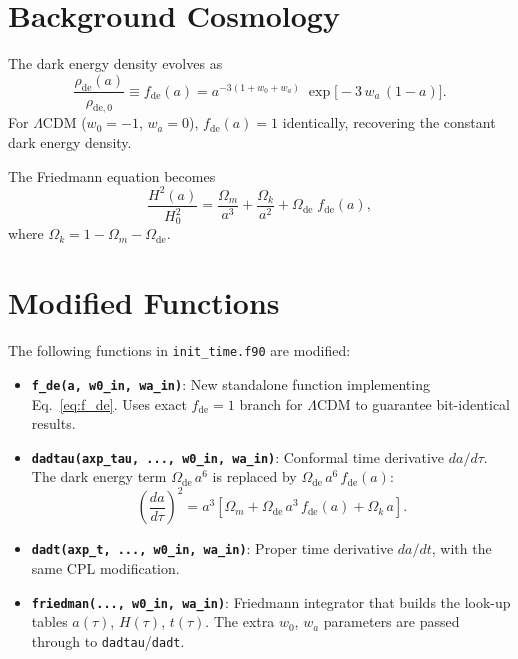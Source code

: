\documentclass[11pt,fleqn]{book}
\begin{document}
\section{Background Cosmology}

The dark energy density evolves as
\begin{equation}\label{eq:f_de}
  \frac{\rho_{\mathrm{de}}(a)}{\rho_{\mathrm{de},0}}
  \equiv f_{\mathrm{de}}(a)
  = a^{-3(1+w_0+w_a)}\;\exp\!\bigl[-3\,w_a\,(1-a)\bigr].
\end{equation}
For $\Lambda$CDM ($w_0=-1$, $w_a=0$), $f_{\mathrm{de}}(a) = 1$ identically, recovering the constant dark energy density.

The Friedmann equation becomes
\begin{equation}\label{eq:friedmann_cpl}
  \frac{H^2(a)}{H_0^2}
  = \frac{\Omega_m}{a^3} + \frac{\Omega_k}{a^2}
    + \Omega_{\mathrm{de}}\;f_{\mathrm{de}}(a),
\end{equation}
where $\Omega_k = 1 - \Omega_m - \Omega_{\mathrm{de}}$.

\section{Modified Functions}

The following functions in \texttt{init\_time.f90} are modified:

\begin{itemize}[nosep]
  \item \textbf{\texttt{f\_de(a, w0\_in, wa\_in)}}: New standalone function implementing Eq.~\eqref{eq:f_de}.  Uses exact $f_{\mathrm{de}}=1$ branch for $\Lambda$CDM to guarantee bit-identical results.

  \item \textbf{\texttt{dadtau(axp\_tau, ..., w0\_in, wa\_in)}}: Conformal time derivative $da/d\tau$.  The dark energy term $\Omega_{\mathrm{de}}\,a^6$ is replaced by $\Omega_{\mathrm{de}}\,a^6\,f_{\mathrm{de}}(a)$:
  \begin{equation}
    \left(\frac{da}{d\tau}\right)^2 = a^3\!\left[\Omega_m + \Omega_{\mathrm{de}}\,a^3\,f_{\mathrm{de}}(a) + \Omega_k\,a\right].
  \end{equation}

  \item \textbf{\texttt{dadt(axp\_t, ..., w0\_in, wa\_in)}}: Proper time derivative $da/dt$, with the same CPL modification.

  \item \textbf{\texttt{friedman(..., w0\_in, wa\_in)}}: Friedmann integrator that builds the look-up tables $a(\tau)$, $H(\tau)$, $t(\tau)$.  The extra $w_0$, $w_a$ parameters are passed through to \texttt{dadtau}/\texttt{dadt}.
\end{itemize}
\end{document}
